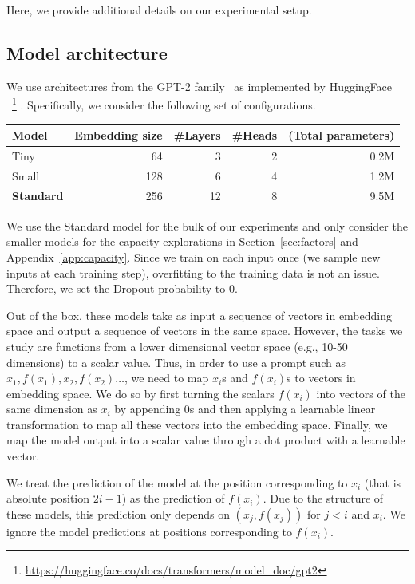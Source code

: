 Here, we provide additional details on our experimental setup.

\subsection{Model architecture}
\label{app:architecture}

We use architectures from the GPT-2 family~\citep{radford2018improving} as implemented by HuggingFace~\citep{wolf-etal-2020-transformers}
~\footnote{\url{https://huggingface.co/docs/transformers/model_doc/gpt2}} .
Specifically, we consider the following set of configurations.
\begin{center}
    \begin{tabular}{lrrrr}
    \toprule
        Model & Embedding size & \#Layers & \#Heads & (Total parameters) \\
    \midrule
        Tiny & 64 & 3 & 2 & 0.2M \\
        Small & 128 & 6 & 4 & 1.2M \\
        \textbf{Standard} & 256 & 12 & 8 & 9.5M \\
    \bottomrule
    \end{tabular}
\end{center}
We use the Standard model for the bulk of our experiments and only consider the smaller models for the capacity explorations in Section~\ref{sec:factors} and Appendix~\ref{app:capacity}.
Since we train on each input once (we sample new inputs at each training step), overfitting to the training data is not an issue. Therefore, we set the Dropout probability to 0.

Out of the box, these models take as input a sequence of vectors in embedding space and output a sequence of vectors in the same space.
However, the tasks we study are functions from a lower dimensional vector space (e.g., 10-50 dimensions) to a scalar value.
Thus, in order to use a prompt such as $x_1, f(x_1), x_2, f(x_2)\ldots$, we need to map $x_i$s and $f(x_i)$s to vectors in embedding space.
We do so by first turning the scalars $f(x_i)$ into vectors of the same dimension as $x_i$ by appending 0s and then applying a learnable linear transformation to map all these vectors into the embedding space.
Finally, we map the model output into a scalar value through a dot product with a learnable vector.

We treat the prediction of the model at the position corresponding to $x_i$ (that is absolute position $2i-1$) as the prediction of $f(x_i)$.
Due to the structure of these models, this prediction only depends on $(x_j, f(x_j))$ for $j<i$ and $x_i$.
We ignore the model predictions at positions corresponding to $f(x_i)$.

